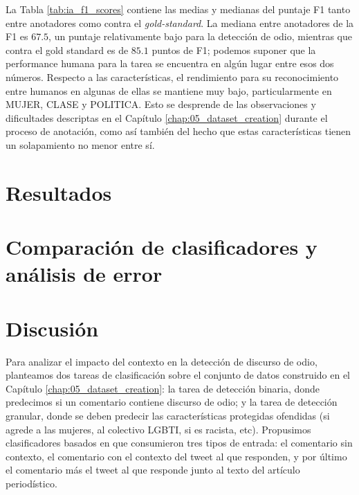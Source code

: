 La Tabla \ref{tab:ia_f1_scores} contiene las medias y medianas del puntaje F1 tanto entre anotadores como contra el \emph{gold-standard}. La mediana entre anotadores de la F1 es $67.5$, un puntaje relativamente bajo para la detección de odio, mientras que contra el gold standard es de $85.1$ puntos de F1; podemos suponer que la performance humana para la tarea se encuentra en algún lugar entre esos dos números. Respecto a las características, el rendimiento para su reconocimiento entre humanos en algunas de ellas se mantiene muy bajo, particularmente en MUJER, CLASE y POLITICA. Esto se desprende de las observaciones y dificultades descriptas en el Capítulo \ref{chap:05_dataset_creation} durante el proceso de anotación, como así también del hecho que estas características tienen un solapamiento no menor entre sí.



\section{Resultados}
\label{sec:06_results}


\section{Comparación de clasificadores y análisis de error}





\section{Discusión}

Para analizar el impacto del contexto en la detección de discurso de odio, planteamos dos tareas de clasificación sobre el conjunto de datos construido en el Capítulo \ref{chap:05_dataset_creation}: la tarea de detección binaria, donde predecimos si un comentario contiene discurso de odio; y la tarea de detección granular, donde se deben predecir las características protegidas ofendidas (si agrede a las mujeres, al colectivo LGBTI, si es racista, etc). Propusimos clasificadores basados en \beto{} que consumieron tres tipos de entrada: el comentario sin contexto, el comentario con el contexto del tweet al que responden, y por último el comentario más el tweet al que responde junto al texto del artículo periodístico.

